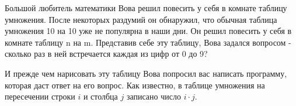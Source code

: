 Большой любитель математики Вова решил повесить у себя в комнате таблицу умножения. После некоторых раздумий он обнаружил, что обычная таблица умножения 10 на 10 уже не популярна в наши дни. Он решил повесить у себя в комнате таблицу n на m. Представив себе эту таблицу, Вова задался вопросом - сколько раз в ней встречается каждая из цифр от 0 до 9?


И прежде чем нарисовать эту таблицу Вова попросил вас написать программу, которая даст ответ на его вопрос. 
Как известно, в таблице умножения на пересечении строки $i$ и столбца $j$ записано число $i \cdot j$. 